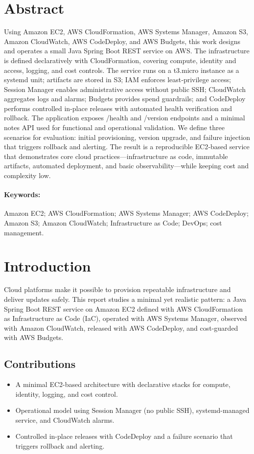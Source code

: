 \documentclass[12pt]{article}
\begin{document}
\section*{Abstract}
Using Amazon EC2, AWS CloudFormation, AWS Systems Manager, Amazon S3, Amazon CloudWatch, AWS CodeDeploy, and AWS Budgets, this work designs and operates a small Java Spring Boot REST service on AWS. The infrastructure is defined declaratively with CloudFormation, covering compute, identity and access, logging, and cost controls. The service runs on a t3.micro instance as a systemd unit; artifacts are stored in S3; IAM enforces least‑privilege access; Session Manager enables administrative access without public SSH; CloudWatch aggregates logs and alarms; Budgets provides spend guardrails; and CodeDeploy performs controlled in-place releases with automated health verification and rollback. The application exposes /health and /version endpoints and a minimal notes API used for functional and operational validation. We define three scenarios for evaluation: initial provisioning, version upgrade, and failure injection that triggers rollback and alerting. The result is a reproducible EC2‑based service that demonstrates core cloud practices—infrastructure as code, immutable artifacts, automated deployment, and basic observability—while keeping cost and complexity low.

\paragraph{Keywords:}
Amazon EC2; AWS CloudFormation; AWS Systems Manager; AWS CodeDeploy; Amazon S3; Amazon CloudWatch; Infrastructure as Code; DevOps; cost management.

\clearpage
\section{Introduction}
Cloud platforms make it possible to provision repeatable infrastructure and deliver updates safely. This report studies a minimal yet realistic pattern: a Java Spring Boot REST service on Amazon EC2 defined with AWS CloudFormation as Infrastructure as Code (IaC), operated with AWS Systems Manager, observed with Amazon CloudWatch, released with AWS CodeDeploy, and cost-guarded with AWS Budgets.

\subsection{Contributions}
\begin{itemize}
\item A minimal EC2-based architecture with declarative stacks for compute, identity, logging, and cost control.
\item Operational model using Session Manager (no public SSH), systemd-managed service, and CloudWatch alarms.
\item Controlled in-place releases with CodeDeploy and a failure scenario that triggers rollback and alerting.
\end{itemize}
\end{document}
